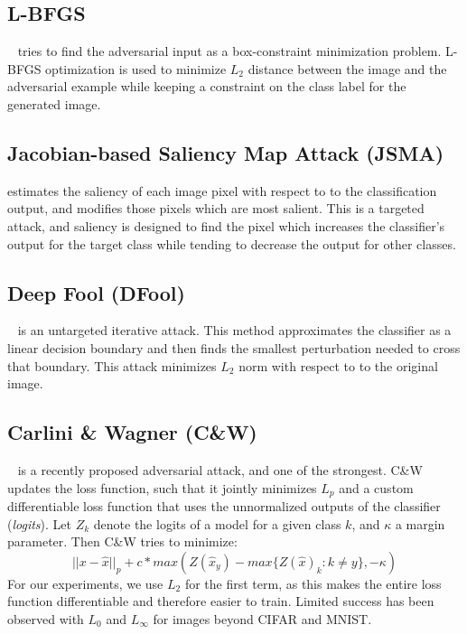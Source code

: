 \subsection{L-BFGS} ~\cite{Szegedy2013IntriguingPO} tries to find the adversarial input as a box-constraint minimization problem.
L-BFGS optimization is used to minimize $L_2$ distance between the image and the adversarial example while keeping a constraint on the class label for the generated image.


\subsection{Jacobian-based Saliency Map Attack (JSMA)} 
\cite{papernot2016limitations} estimates the saliency of each image pixel with respect to to the classification output, and modifies those pixels which are most salient. This is a targeted attack, and saliency is designed to find the pixel which increases the classifier's output for the target class while tending to decrease the output for other classes.

\subsection{Deep Fool (DFool)}
 ~\cite{MoosaviDezfooli2016DeepFoolAS} is an untargeted iterative attack. 
This method approximates the classifier as a linear decision boundary and then finds the smallest perturbation needed to cross that boundary.
This attack minimizes $L_2$ norm with respect to to the original image. 

\subsection{Carlini \& Wagner (C\&W)}
 ~\cite{Carlini2017TowardsET} is a recently proposed adversarial attack, and one of the strongest.
C\&W updates the loss function, such that it jointly minimizes $L_p$ and a custom differentiable loss function that uses the unnormalized outputs of the classifier (\textit{logits}). 
Let $Z_k$ denote the logits of a model for a given class $k$, and $\kappa$ a margin parameter. Then C\&W tries to minimize:
\begin{equation}
|| x - \hat{x} ||_p + c* max\left(Z(\hat{x}_y) - max\{Z(\hat{x})_k : k \neq y\},-\kappa\right)
\end{equation}
For our experiments, we use $L_2$ for the first term, as this makes the entire loss function differentiable and therefore easier to train. 
Limited success has been observed with $L_0$ and $L_\infty$ for images beyond CIFAR and MNIST.

